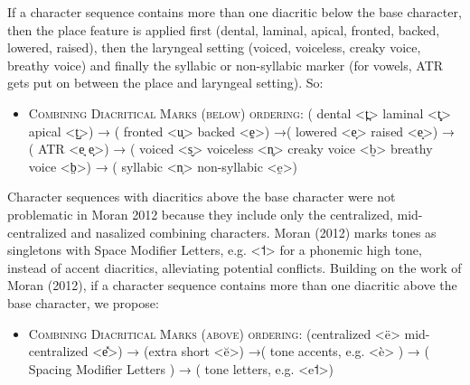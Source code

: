 If a character sequence contains more than one diacritic below the base character, then the place feature is applied first (dental, laminal, apical, fronted, backed, lowered, raised), then the laryngeal setting (voiced, voiceless, creaky voice, breathy voice) and finally the syllabic or non-syllabic marker (for vowels, ATR gets put on between the place and laryngeal setting). So:
\begin{itemize}
	\itemsep1pt\parskip0pt 
	\item \textsc{Combining Diacritical Marks (below) ordering:} ( dental <t̪> \textbar{} laminal <t̻> \textbar{} apical <t̺>) → ( fronted <u̟> \textbar{} backed <e̠>) →( lowered <e̞> \textbar{} raised <e̝>) → ( ATR <e̘ e̙>) → ( voiced <s̬> \textbar{} voiceless <n̥> \textbar{} creaky voice <b̰> \textbar{} breathy voice <b̤>) → ( syllabic <n̩> \textbar{} non-syllabic <e̯>) 
\end{itemize}

Character sequences with diacritics above the base character were not problematic in Moran 2012 because they include only the centralized, mid-centralized and nasalized combining characters. Moran (2012) marks tones as singletons with Space Modifier Letters, e.g. \textless{}˦\textgreater{} for a phonemic high tone, instead of accent diacritics, alleviating potential conflicts. Building on the work of Moran (2012), if a character sequence contains more than one diacritic above the base character, we propose:
\begin{itemize}
	\itemsep1pt\parskip0pt 
	\item \textsc{Combining Diacritical Marks (above) ordering:} (centralized <ë> \textbar{} mid-centralized <e̽>) → (extra short <ĕ>) →( tone accents, e.g. <è> ) → ( Spacing Modifier Letters ) → ( tone letters, e.g. <e˦>) 
\end{itemize}